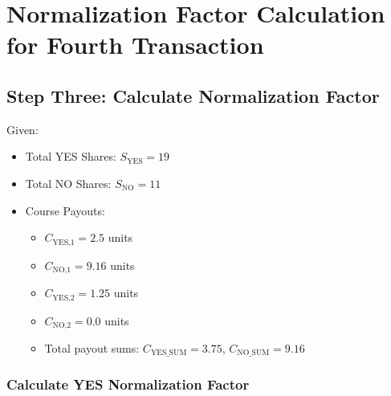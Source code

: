 \documentclass{article}
\begin{document}
\begin{center}
\end{center}

\section*{Normalization Factor Calculation for Fourth Transaction}

\subsection*{Step Three: Calculate Normalization Factor}

Given:
\begin{itemize}
    \item Total YES Shares: \( S_{\text{YES}} = 19 \)
    \item Total NO Shares: \( S_{\text{NO}} = 11 \)
    \item Course Payouts:
    \begin{itemize}
        \item \( C_{\text{YES,1}} = 2.5 \) units
        \item \( C_{\text{NO,1}} = 9.16 \) units
        \item \( C_{\text{YES,2}} = 1.25 \) units
        \item \( C_{\text{NO,2}} = 0.0 \) units
        \item Total payout sums: \( C_{\text{YES\_SUM}} = 3.75 \), \( C_{\text{NO\_SUM}} = 9.16 \)
    \end{itemize}
\end{itemize}

\subsubsection*{Calculate YES Normalization Factor}
\end{document}
